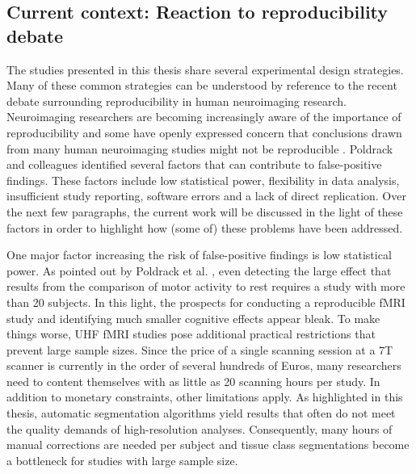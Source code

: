 \subsection{Current context: Reaction to reproducibility debate}
The studies presented in this thesis share several experimental design strategies. Many of these common strategies can be understood by reference to the recent debate surrounding reproducibility in human neuroimaging research. Neuroimaging researchers are becoming increasingly aware of the importance of reproducibility and some have openly expressed concern that conclusions drawn from many human neuroimaging studies might not be reproducible \parencite{Poldrack2017a}. Poldrack and colleagues \parencite*{Poldrack2017a} identified several factors that can contribute to false-positive findings. These factors include low statistical power, flexibility in data analysis, insufficient study reporting, software errors and a lack of direct replication. Over the next few paragraphs, the current work will be discussed in the light of these factors in order to highlight how (some of) these problems have been addressed.

One major factor increasing the risk of false-positive findings is low statistical power. As pointed out by Poldrack et al. \parencite*{Poldrack2017a}, even detecting the large effect that results from the comparison of motor activity to rest requires a study with more than 20 subjects. In this light, the prospects for conducting a reproducible fMRI study and identifying much smaller cognitive effects appear bleak. To make things worse, UHF fMRI studies pose additional practical restrictions that prevent large sample sizes. Since the price of a single scanning session at a 7T scanner is currently in the order of several hundreds of Euros, many researchers need to content themselves with as little as 20 scanning hours per study. In addition to monetary constraints, other limitations apply. As highlighted in this thesis, automatic segmentation algorithms yield results that often do not meet the quality demands of high-resolution analyses. Consequently, many hours of manual corrections are needed per subject and tissue class segmentations become a bottleneck for studies with large sample size.

